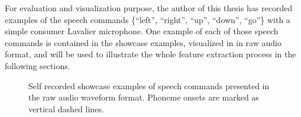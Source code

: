 For evaluation and visualization purpose, the author of this thesis has recorded examples of the speech commands \{\enquote{left}, \enquote{right}, \enquote{up}, \enquote{down}, \enquote{go}\} with a simple consumer Lavalier microphone.
One example of each of those speech commands is contained in the showcase examples, visualized in  in raw audio format, and will be used to illustrate the whole feature extraction process in the following sections.
\begin{figure}[!ht]
  \centering
  \caption{Self recorded showcase examples of speech commands presented in the raw audio waveform format. Phoneme onsets are marked as vertical dashed lines.}
  \label{fig:signal_raw_showcase}
\end{figure}
